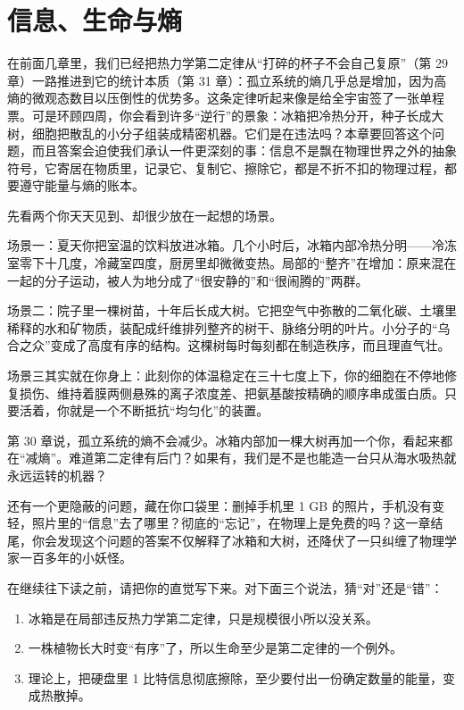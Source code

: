 \chapter{信息、生命与熵}

在前面几章里，我们已经把热力学第二定律从“打碎的杯子不会自己复原”（第 29 章）一路推进到它的统计本质（第 31 章）：孤立系统的熵几乎总是增加，因为高熵的微观态数目以压倒性的优势多。这条定律听起来像是给全宇宙签了一张单程票。可是环顾四周，你会看到许多“逆行”的景象：冰箱把冷热分开，种子长成大树，细胞把散乱的小分子组装成精密机器。它们是在违法吗？本章要回答这个问题，而且答案会迫使我们承认一件更深刻的事：信息不是飘在物理世界之外的抽象符号，它寄居在物质里，记录它、复制它、擦除它，都是不折不扣的物理过程，都要遵守能量与熵的账本。


先看两个你天天见到、却很少放在一起想的场景。

场景一：夏天你把室温的饮料放进冰箱。几个小时后，冰箱内部冷热分明——冷冻室零下十几度，冷藏室四度，厨房里却微微变热。局部的“整齐”在增加：原来混在一起的分子运动，被人为地分成了“很安静的”和“很闹腾的”两群。

场景二：院子里一棵树苗，十年后长成大树。它把空气中弥散的二氧化碳、土壤里稀释的水和矿物质，装配成纤维排列整齐的树干、脉络分明的叶片。小分子的“乌合之众”变成了高度有序的结构。这棵树每时每刻都在制造秩序，而且理直气壮。

场景三其实就在你身上：此刻你的体温稳定在三十七度上下，你的细胞在不停地修复损伤、维持着膜两侧悬殊的离子浓度差、把氨基酸按精确的顺序串成蛋白质。只要活着，你就是一个不断抵抗“均匀化”的装置。

第 30 章说，孤立系统的熵不会减少。冰箱内部加一棵大树再加一个你，看起来都在“减熵”。难道第二定律有后门？如果有，我们是不是也能造一台只从海水吸热就永远运转的机器？

还有一个更隐蔽的问题，藏在你口袋里：删掉手机里 1 GB 的照片，手机没有变轻，照片里的“信息”去了哪里？彻底的“忘记”，在物理上是免费的吗？这一章结尾，你会发现这个问题的答案不仅解释了冰箱和大树，还降伏了一只纠缠了物理学家一百多年的小妖怪。


在继续往下读之前，请把你的直觉写下来。对下面三个说法，猜“对”还是“错”：

\begin{enumerate}[leftmargin=2em]
\item 冰箱是在局部违反热力学第二定律，只是规模很小所以没关系。
\item 一株植物长大时变“有序”了，所以生命至少是第二定律的一个例外。
\item 理论上，把硬盘里 1 比特信息彻底擦除，至少要付出一份确定数量的能量，变成热散掉。
\end{enumerate}

